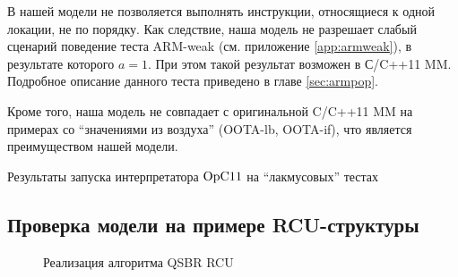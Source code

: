 В нашей модели не позволяется выполнять инструкции, относящиеся к одной локации, не по порядку.
Как следствие, наша модель не разрешает слабый сценарий поведение теста \textrm{ARM-weak}
(см. приложение \ref{app:armweak}), в результате которого $a = 1$.
При этом такой результат возможен в С/C++11 MM.
Подробное описание данного теста приведено в главе \ref{sec:armpop}.

Кроме того, наша модель не совпадает с оригинальной C/C++11 MM на примерах со ``значениями из воздуха''
(\textrm{OOTA-lb}, \textrm{OOTA-if}), что является преимуществом нашей модели.


\begin{table}
\centering
{%
 \small
 
}
\caption{Результаты запуска интерпретатора $\mathrm{OpC11}$ на ``лакмусовых'' тестах}
\label{fig:litmusTbl}
\end{table}


\subsection{Проверка модели на примере RCU-структуры}
\label{sec:opc11:rcu}

\begin{figure*}

\caption[Реализация алгоритма QSBR RCU]
{Реализация алгоритма QSBR RCU}
\label{fig:rcuProg} \end{figure*}


